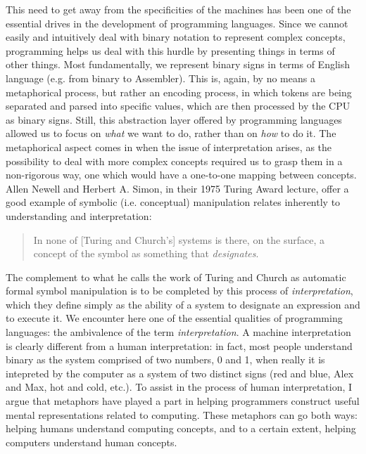 \documentclass{article}
\begin{document}
This need to get away from the specificities of the machines has been one of the essential drives in the development of programming languages. Since we cannot easily and intuitively deal with binary notation to represent complex concepts, programming helps us deal with this hurdle by presenting things in terms of other things. Most fundamentally, we represent binary signs in terms of English language (e.g. from binary to Assembler). This is, again, by no means a metaphorical process, but rather an encoding process, in which tokens are being separated and parsed into specific values, which are then processed by the CPU as binary signs. Still, this abstraction layer offered by programming languages allowed us to focus on \emph{what} we want to do, rather than on \emph{how} to do it. The metaphorical aspect comes in when the issue of interpretation arises, as the possibility to deal with more complex concepts required us to grasp them in a non-rigorous way, one which would have a one-to-one mapping between concepts. Allen Newell and Herbert A. Simon, in their 1975 Turing Award lecture, offer a good example of symbolic (i.e. conceptual) manipulation relates inherently to understanding and interpretation:

\begin{quote}
  In none of [Turing and Church's] systems is there, on the surface, a concept of the symbol as something that \emph{designates}.
\end{quote}

The complement to what he calls the work of Turing and Church as automatic formal symbol manipulation is to be completed by this process of \emph{interpretation}, which they define simply as the ability of a system to designate an expression and to execute it. We encounter here one of the essential qualities of programming languages: the ambivalence of the term \emph{interpretation}. A machine interpretation is clearly different from a human interpretation: in fact, most people understand binary as the system comprised of two numbers, 0 and 1, when really it is intepreted by the computer as a system of two distinct signs (red and blue, Alex and Max, hot and cold, etc.). To assist in the process of human interpretation, I argue that metaphors have played a part in helping programmers construct useful mental representations related to computing. These metaphors can go both ways: helping humans understand computing concepts, and to a certain extent, helping computers understand human concepts.
\end{document}
